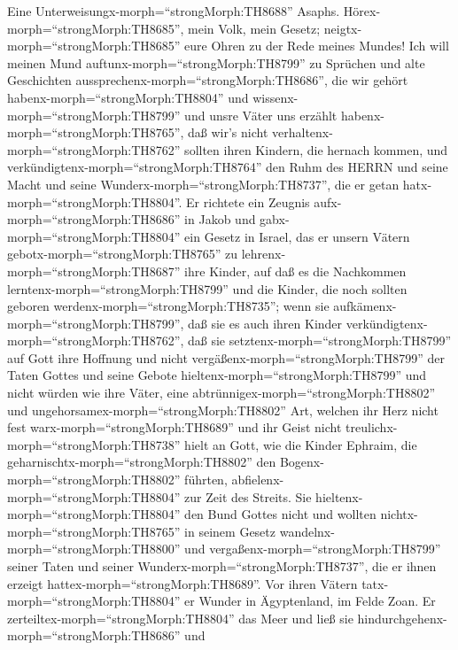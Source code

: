  Eine Unterweisungx-morph=``strongMorph:TH8688'' Asaphs.
Hörex-morph=``strongMorph:TH8685'', mein Volk, mein Gesetz;
neigtx-morph=``strongMorph:TH8685'' eure Ohren zu der Rede meines
Mundes!  Ich will meinen Mund
auftunx-morph=``strongMorph:TH8799'' zu Sprüchen und alte Geschichten
aussprechenx-morph=``strongMorph:TH8686'',  die wir gehört
habenx-morph=``strongMorph:TH8804'' und
wissenx-morph=``strongMorph:TH8799'' und unsre Väter uns erzählt
habenx-morph=``strongMorph:TH8765'',  daß wir's nicht
verhaltenx-morph=``strongMorph:TH8762'' sollten ihren Kindern, die
hernach kommen, und verkündigtenx-morph=``strongMorph:TH8764'' den Ruhm
des HERRN und seine Macht und seine
Wunderx-morph=``strongMorph:TH8737'', die er getan
hatx-morph=``strongMorph:TH8804''.  Er richtete ein Zeugnis
aufx-morph=``strongMorph:TH8686'' in Jakob und
gabx-morph=``strongMorph:TH8804'' ein Gesetz in Israel, das er unsern
Vätern gebotx-morph=``strongMorph:TH8765'' zu
lehrenx-morph=``strongMorph:TH8687'' ihre Kinder,  auf daß
es die Nachkommen lerntenx-morph=``strongMorph:TH8799'' und die Kinder,
die noch sollten geboren werdenx-morph=``strongMorph:TH8735''; wenn sie
aufkämenx-morph=``strongMorph:TH8799'', daß sie es auch ihren Kinder
verkündigtenx-morph=``strongMorph:TH8762'',  daß sie
setztenx-morph=``strongMorph:TH8799'' auf Gott ihre Hoffnung und nicht
vergäßenx-morph=``strongMorph:TH8799'' der Taten Gottes und seine Gebote
hieltenx-morph=``strongMorph:TH8799''  und nicht würden wie
ihre Väter, eine abtrünnigex-morph=``strongMorph:TH8802'' und
ungehorsamex-morph=``strongMorph:TH8802'' Art, welchen ihr Herz nicht
fest warx-morph=``strongMorph:TH8689'' und ihr Geist nicht
treulichx-morph=``strongMorph:TH8738'' hielt an Gott,  wie
die Kinder Ephraim, die geharnischtx-morph=``strongMorph:TH8802'' den
Bogenx-morph=``strongMorph:TH8802'' führten,
abfielenx-morph=``strongMorph:TH8804'' zur Zeit des Streits.
 Sie hieltenx-morph=``strongMorph:TH8804'' den Bund Gottes
nicht und wollten nichtx-morph=``strongMorph:TH8765'' in seinem Gesetz
wandelnx-morph=``strongMorph:TH8800''  und
vergaßenx-morph=``strongMorph:TH8799'' seiner Taten und seiner
Wunderx-morph=``strongMorph:TH8737'', die er ihnen erzeigt
hattex-morph=``strongMorph:TH8689''.  Vor ihren Vätern
tatx-morph=``strongMorph:TH8804'' er Wunder in Ägyptenland, im Felde
Zoan.  Er zerteiltex-morph=``strongMorph:TH8804'' das Meer
und ließ sie hindurchgehenx-morph=``strongMorph:TH8686'' und
